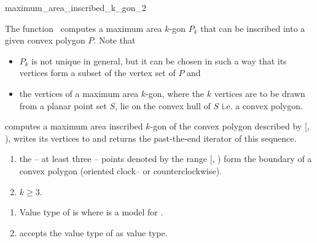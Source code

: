 
\cgalColumnLayout

\begin{ccRefFunction}{maximum_area_inscribed_k_gon_2}
  
  \ccDefinition The function \ccRefName\ computes a maximum area
  $k$-gon $P_k$ that can be inscribed into a given convex polygon $P$.
  Note that
  \begin{itemize}
  \item $P_k$ is not unique in general, but it can be chosen in such a
    way that its vertices form a subset of the vertex set of $P$ and
  \item the vertices of a maximum area $k$-gon, where the $k$ vertices
    are to be drawn from a planar point set $S$, lie on the convex
    hull of $S$ i.e. a convex polygon.
  \end{itemize}


  \def\ccLongParamLayout{\ccTrue} 
  
  
  computes a maximum area inscribed $k$-gon of the convex polygon
  described by [, ), writes its
  vertices to  and returns the past-the-end iterator of this
  sequence.
  
  \ccPrecond
  \begin{enumerate}
  \item the -- at least three -- points denoted by the range
    [, ) form the boundary of a
    convex polygon (oriented clock-- or counterclockwise).
  \item $k \ge 3$.
  \end{enumerate}
  
  \ccRequire
  \begin{enumerate}
  \item Value type of  is 
    where  is a model for .
  \item {} accepts the value type of
     as value type.
  \end{enumerate}


\end{ccRefFunction}
